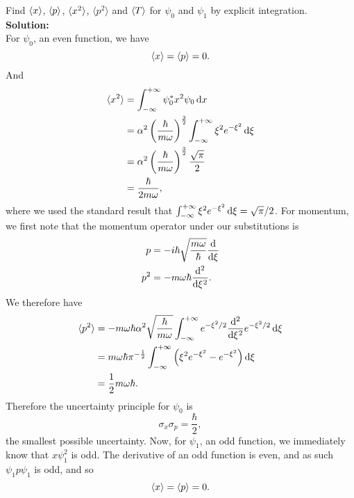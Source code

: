 \begin{wex}
Find $\left<x\right>$, $\left<p\right>$, $\langle x^2\rangle$, $\langle p^2\rangle$ and $\left<T\right>$ for $\psi_0$ and $\psi_1$ by explicit integration. \\
\textbf{Solution: }\\
For $\psi_0$, an even function, we have 
\begin{equation}
\left<x\right>=\left<p\right>=0.
\end{equation}
And 
\begin{subequations}
\begin{align}
\lgl x^2\rgl&=\intinf\psi_0^*x^2\psi_0\dx\\
&=\alpha^2\lf(\frac{\hbar}{m\omega} \rt)^{\frac{3}{2}}\intinf\xi^2e^{-\xi^2}\dif\xi\\
&=\alpha^2\lf(\frac{\hbar}{m\omega} \rt)^{\frac{3}{2}}\frac{\sqrt{\pi}}{2}\\
&=\frac{\hbar}{2m\omega}, 
\end{align}
\end{subequations}
where we used the standard result that $\intinf\xi^2e^{-\xi^2}\dif\xi=\sqrt{\pi}/2$. 
For momentum, we first note that the momentum operator under our substitutions is
\begin{subequations}
\begin{align}
p&=-i\hbar\sqrt{\frac{m\omega}{\hbar}}\diff{}{\xi}\\
p^2&=-m\omega\hbar\diff[2]{}{\xi}.
\end{align}
\end{subequations}
We therefore have
\begin{subequations}
\begin{align}
\lgl p^2\rgl&=-m\omega\hbar\alpha^2\sqrt{\frac{\hbar}{m\omega}}\intinf e^{-\xi^2/2}\diff*[2]{e^{-\xi^2/2}}\xi\dif\xi\\
&=m\omega\hbar\pi^{-\frac{1}{2}}\intinf\lf(\xi^2 e^{-\xi^2}-e^{-\xi^2}\rt)\dif \xi\\
&=\frac{1}{2}m\omega\hbar.
\end{align}
\end{subequations}
Therefore the uncertainty principle for $\psi_0$ is 
\begin{equation}
\sigma_x\sigma_p=\frac{\hbar}{2},
\end{equation}
the smallest possible uncertainty. 
Now, for $\psi_1$, an odd function, we immediately know that $x\psi_1^2$ is odd. The derivative of an odd function is even, and as such $\psi_1p \psi_1$ is odd, and so
\begin{equation}
\lf<x\rt>=\lf<p\rt>=0.

\end{equation}
\end{wex}

